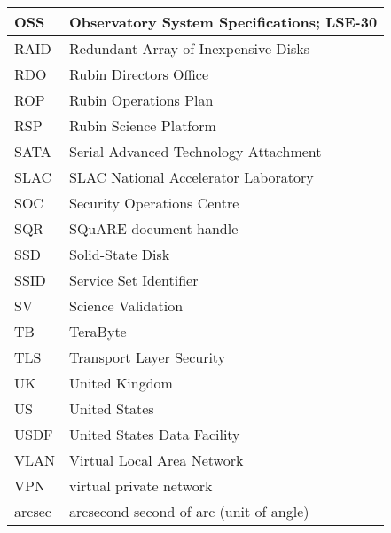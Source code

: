 \begin{longtable}{p{}p{}}
OSS & Observatory System Specifications; LSE-30 \\\hline
RAID & Redundant Array of Inexpensive Disks \\\hline
RDO & Rubin Directors Office \\\hline
ROP & Rubin Operations Plan \\\hline
RSP & Rubin Science Platform \\\hline
SATA & Serial Advanced Technology Attachment \\\hline
SLAC & SLAC National Accelerator Laboratory \\\hline
SOC & Security Operations Centre \\\hline
SQR & SQuARE document handle \\\hline
SSD & Solid-State Disk \\\hline
SSID & Service Set Identifier \\\hline
SV & Science Validation \\\hline
TB & TeraByte \\\hline
TLS & Transport Layer Security \\\hline
UK & United Kingdom \\\hline
US & United States \\\hline
USDF & United States Data Facility \\\hline
VLAN &  Virtual Local Area Network \\\hline
VPN & virtual private network \\\hline
arcsec & arcsecond second of arc (unit of angle) \\\hline
\end{longtable}
